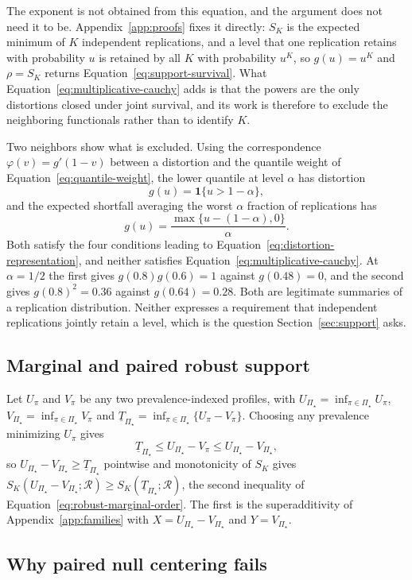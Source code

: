 \documentclass[11pt]{article}
\newcommand{\Regime}{\mathcal{R}}
\newcommand{\PSet}{\Pi_\star}
\theoremstyle{remark}
\begin{document}
The exponent is not obtained from this equation, and the argument does not need it to be. Appendix~\ref{app:proofs} fixes it directly: $S_K$ is the expected minimum of $K$ independent replications, and a level that one replication retains with probability $u$ is retained by all $K$ with probability $u^{K}$, so $g(u)=u^{K}$ and $\rho=S_K$ returns Equation~\eqref{eq:support-survival}. What Equation~\eqref{eq:multiplicative-cauchy} adds is that the powers are the only distortions closed under joint survival, and its work is therefore to exclude the neighboring functionals rather than to identify $K$.

Two neighbors show what is excluded. Using the correspondence $\varphi(v)=g'(1-v)$ between a distortion and the quantile weight of Equation~\eqref{eq:quantile-weight}, the lower quantile at level $\alpha$ has distortion
\[
g(u)=\mathbf{1}\{u>1-\alpha\},
\]
and the expected shortfall averaging the worst $\alpha$ fraction of replications has
\[
g(u)=\frac{\max\{u-(1-\alpha),0\}}{\alpha}.
\]
Both satisfy the four conditions leading to Equation~\eqref{eq:distortion-representation}, and neither satisfies Equation~\eqref{eq:multiplicative-cauchy}. At $\alpha=1/2$ the first gives $g(0.8)g(0.6)=1$ against $g(0.48)=0$, and the second gives $g(0.8)^2=0.36$ against $g(0.64)=0.28$. Both are legitimate summaries of a replication distribution. Neither expresses a requirement that independent replications jointly retain a level, which is the question Section~\ref{sec:support} asks.

\subsection{Marginal and paired robust support}

Let $U_\pi$ and $V_\pi$ be any two prevalence-indexed profiles, with $U_{\PSet}=\inf_{\pi\in\PSet}U_\pi$, $V_{\PSet}=\inf_{\pi\in\PSet}V_\pi$ and $\underline{T}_{\PSet}=\inf_{\pi\in\PSet}\{U_\pi-V_\pi\}$. Choosing any prevalence minimizing $U_\pi$ gives
\[
\underline{T}_{\PSet}
\leq
U_{\PSet}-V_\pi
\leq
U_{\PSet}-V_{\PSet},
\]
so $U_{\PSet}-V_{\PSet}\geq\underline{T}_{\PSet}$ pointwise and monotonicity of $S_K$ gives $S_K(U_{\PSet}-V_{\PSet};\Regime)\geq S_K(\underline{T}_{\PSet};\Regime)$, the second inequality of Equation~\eqref{eq:robust-marginal-order}. The first is the superadditivity of Appendix~\ref{app:families} with $X=U_{\PSet}-V_{\PSet}$ and $Y=V_{\PSet}$.

\subsection{Why paired null centering fails}
\label{app:paired-null}
\end{document}
